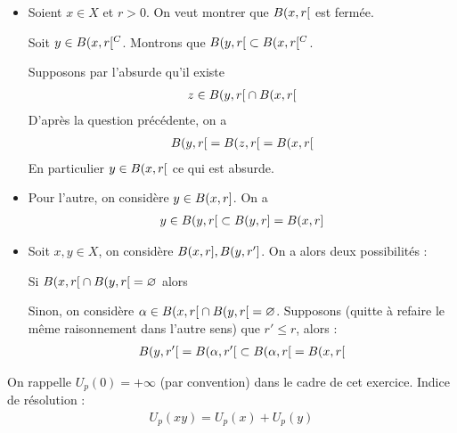 \documentclass[french,a4paper,10pt]{article}
\begin{document}
\begin{td-sol}
\begin{itemize}
			Soit $x'\in B(x,\varepsilon)$, on a
			\[\begin{gathered}
				d(x',x)\le\varepsilon\\\text{et }d(x,y)\le\varepsilon\\\text{et }d(x',y)\le\max\{d(x',x),d(x,y)\}
			\end{gathered}\]
			Et donc $x'\in B(y,\varepsilon)$, soit que
				\[\begin{aligned}
					\bolo{x,\varepsilon}\sub \bolo{y,\varepsilon}
				\end{aligned}\]
			Pour l'autre sens on a
				\[\begin{aligned}
					y\in\bolo{x,\varepsilon}&\Longleftrightarrow d(x,y)<\varepsilon\\
					&\Longleftrightarrow x\in \bolo{y,\varepsilon}
				\end{aligned}\]
				
			\item Soient $x\in X$ et $r>0$. On veut montrer que $B({x,r}\mathopen{}[\mathclose{}$ est fermée.
			
			Soit $y\in B({x,r}\mathopen{}[\mathclose{}^C$. Montrons que $B({y,r}\mathopen{}[\mathclose{}\subset B({x,r}\mathopen{}[\mathclose{}^C$.
			
			Supposons par l'absurde qu'il existe
				\[\begin{aligned}
					z\in B({y,r}\mathopen{}[\mathclose{}\cap B({x,r}\mathopen{}[\mathclose{}
				\end{aligned}\]
			D'après la question précédente, on a
				\[\begin{aligned}
					B({y,r}\mathopen{}[\mathclose{}=B({z,r}\mathopen{}[\mathclose{}=B({x,r}\mathopen{}[\mathclose{}
				\end{aligned}\]
			En particulier $y\in B({x,r}\mathopen{}[\mathclose{}$ ce qui est absurde.
			
			\item Pour l'autre, on considère $y\in B({x,r}\mathopen{}]\mathclose{}$. On a
			\[\begin{aligned}
				y\in B({y,r}\mathopen{}[\mathclose{}\subset B({y,r}\mathopen{}]\mathclose{}=B({x,r}\mathopen{}]\mathclose{}
			\end{aligned}\]
			
			\item Soit $x,y\in X$, on considère $B({x,r}\mathopen{}]\mathclose{},B({y,r'}\mathopen{}]\mathclose{}$. On a alors deux possibilités :
			
			Si $B({x,r}\mathopen{}[\mathclose{}\cap B({y,r}\mathopen{}[\mathclose{}=\varnothing$ alors
			
			
			Sinon, on considère $\alpha \in B({x,r}\mathopen{}[\mathclose{}\cap B({y,r}\mathopen{}[\mathclose{}=\varnothing$. Supposons (quitte à refaire le même raisonnement dans l'autre sens) que $r'\le r$, alors :
				\[\begin{aligned}
					B({y,r'}\mathopen{}[\mathclose{}=B({\alpha,r'}\mathopen{}[\mathclose{}\subset B({\alpha,r}\mathopen{}[\mathclose{}=B({x,r}\mathopen{}[\mathclose{}
				\end{aligned}\]
		\end{itemize}
	\end{td-sol}
	\begin{td-exo}[6]
		On rappelle $U_p(0)=+\infty$ (par convention) dans le cadre de cet exercice. Indice de résolution :
			\[\begin{aligned}
				U_p(xy)=U_p(x)+U_p(y)
			\end{aligned}\]
	\end{td-exo}
	
\end{document}
